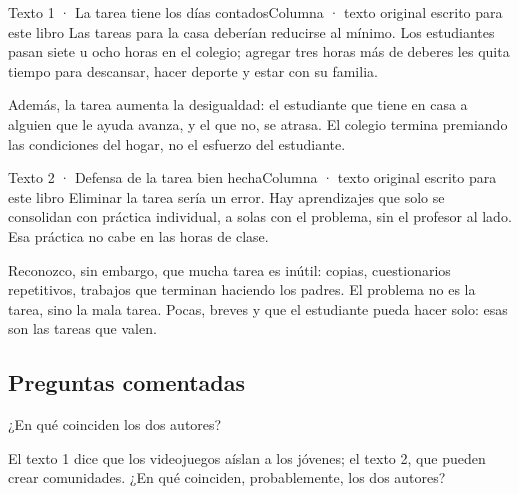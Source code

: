 \begin{texto}{Texto 1 · La tarea tiene los días contados}{Columna · texto original escrito para este libro}
\pa Las tareas para la casa deberían reducirse al mínimo. Los estudiantes pasan siete u ocho horas en el colegio; agregar
tres horas más de deberes les quita tiempo para descansar, hacer deporte y estar con su familia.

\pa Además, la tarea aumenta la desigualdad: el estudiante que tiene en casa a alguien que le ayuda avanza, y el que no,
se atrasa. El colegio termina premiando las condiciones del hogar, no el esfuerzo del estudiante.
\end{texto}

\begin{texto}{Texto 2 · Defensa de la tarea bien hecha}{Columna · texto original escrito para este libro}
\pa Eliminar la tarea sería un error. Hay aprendizajes que solo se consolidan con práctica individual, a solas con el
problema, sin el profesor al lado. Esa práctica no cabe en las horas de clase.

\pa Reconozco, sin embargo, que mucha tarea es inútil: copias, cuestionarios repetitivos, trabajos que terminan
haciendo los padres. El problema no es la tarea, sino la mala tarea. Pocas, breves y que el estudiante pueda hacer solo:
esas son las tareas que valen.
\end{texto}

\subsection{Preguntas comentadas}
\begin{comentada}{¿En qué coinciden los dos autores?}
\end{comentada}

\begin{reto}
El texto 1 dice que los videojuegos aíslan a los jóvenes; el texto 2, que pueden crear comunidades. ¿En qué coinciden,
probablemente, los dos autores?
\end{reto}

